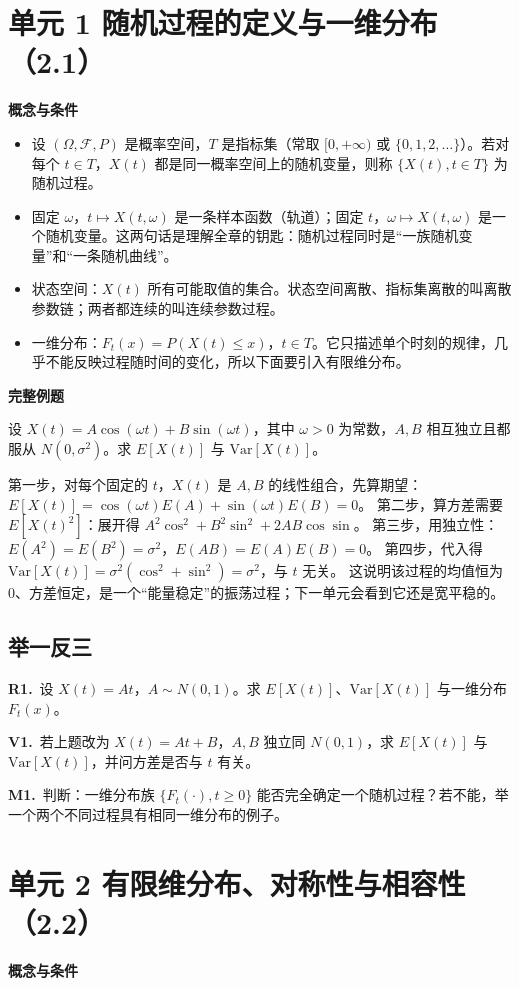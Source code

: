 \documentclass[UTF8,a4paper,11pt]{ctexart}
\newcommand{\PracticeQuestion}[3]{\par\Needspace{4\baselineskip}\noindent\begin{minipage}{\linewidth}\textbf{#1.}\ #2\par\noindent\rule{0pt}{#3mm}\par\end{minipage}\par}
\begin{document}
\clearpage
{}
\section{单元 1 随机过程的定义与一维分布（2.1）}
\textbf{概念与条件}

\begin{itemize}
\item 设 $(\Omega,\mathcal{F},P)$ 是概率空间，$T$ 是指标集（常取 $[0,+\infty)$ 或 $\{0,1,2,\dots\}$）。若对每个 $t\in T$，$X(t)$ 都是同一概率空间上的随机变量，则称 $\{X(t),t\in T\}$ 为随机过程。
\item 固定 $\omega$，$t\mapsto X(t,\omega)$ 是一条样本函数（轨道）；固定 $t$，$\omega\mapsto X(t,\omega)$ 是一个随机变量。这两句话是理解全章的钥匙：随机过程同时是“一族随机变量”和“一条随机曲线”。
\item 状态空间：$X(t)$ 所有可能取值的集合。状态空间离散、指标集离散的叫离散参数链；两者都连续的叫连续参数过程。
\item 一维分布：$F_t(x)=P(X(t)\le x)$，$t\in T$。它只描述单个时刻的规律，几乎不能反映过程随时间的变化，所以下面要引入有限维分布。
\end{itemize}
\textbf{完整例题}

设 $X(t)=A\cos(\omega t)+B\sin(\omega t)$，其中 $\omega>0$ 为常数，$A,B$ 相互独立且都服从 $N(0,\sigma^2)$。求 $E[X(t)]$ 与 $\mathrm{Var}[X(t)]$。

第一步，对每个固定的 $t$，$X(t)$ 是 $A,B$ 的线性组合，先算期望：$E[X(t)]=\cos(\omega t)E(A)+\sin(\omega t)E(B)=0$。 第二步，算方差需要 $E[X(t)^2]$：展开得 $A^2\cos^2+B^2\sin^2+2AB\cos\sin$。 第三步，用独立性：$E(A^2)=E(B^2)=\sigma^2$，$E(AB)=E(A)E(B)=0$。 第四步，代入得 $\mathrm{Var}[X(t)]=\sigma^2(\cos^2+\sin^2)=\sigma^2$，与 $t$ 无关。 这说明该过程的均值恒为 0、方差恒定，是一个“能量稳定”的振荡过程；下一单元会看到它还是宽平稳的。

\subsection{举一反三}
\PracticeQuestion{R1}{设 $X(t)=A t$，$A\sim N(0,1)$。求 $E[X(t)]$、$\mathrm{Var}[X(t)]$ 与一维分布 $F_t(x)$。}{42}
\PracticeQuestion{V1}{若上题改为 $X(t)=A t+B$，$A,B$ 独立同 $N(0,1)$，求 $E[X(t)]$ 与 $\mathrm{Var}[X(t)]$，并问方差是否与 $t$ 有关。}{30}
\PracticeQuestion{M1}{判断：一维分布族 $\{F_t(\cdot),t\ge0\}$ 能否完全确定一个随机过程？若不能，举一个两个不同过程具有相同一维分布的例子。}{40}
\clearpage
{}
\section{单元 2 有限维分布、对称性与相容性（2.2）}
\textbf{概念与条件}
\end{document}
